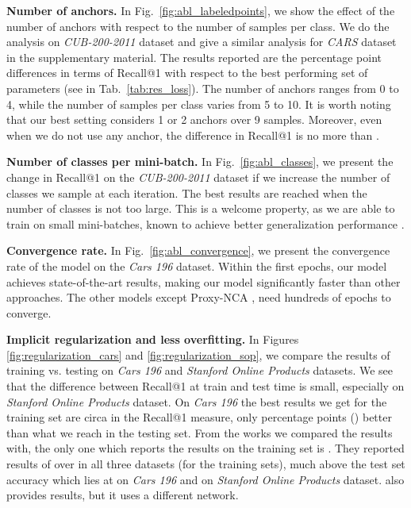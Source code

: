 \documentclass[runningheads]{llncs}
\begin{document}
\textbf{Number of anchors.} 
In Fig.~\ref{fig:abl_labeledpoints}, we show the effect of the number of anchors with respect to the number of samples per class. We do the analysis on \textit{CUB-200-2011} dataset and give a similar analysis for \textit{CARS} dataset in the supplementary material. The results reported are the percentage point differences in terms of Recall@1 with respect to the best performing set of parameters (see  in Tab.~\ref{tab:res_loss}). 
The number of anchors ranges from 0 to 4, while the number of samples per class varies from 5 to 10. 
It is worth noting that our best setting considers 1 or 2 anchors over 9 samples. Moreover, even when we do not use any anchor, the difference in Recall@1 is no more than .


\textbf{Number of classes per mini-batch.}
In Fig.~\ref{fig:abl_classes}, we present the change in Recall@1 on the \textit{CUB-200-2011} dataset if we increase the number of classes we sample at each iteration. The best results are reached when the number of classes is not too large. This is a welcome property, as we are able to train on small mini-batches, known to achieve better generalization performance \cite{DBLP:conf/iclr/KeskarMNST17}.

\textbf{Convergence rate.} In Fig.~\ref{fig:abl_convergence}, we present the convergence rate of the model on the \textit{Cars 196} dataset. Within the first  epochs, our model achieves state-of-the-art results, making our model significantly faster than other approaches. The other models except Proxy-NCA \cite{DBLP:conf/iccv/Movshovitz-Attias17}, need hundreds of epochs to converge. 


\textbf{Implicit regularization and less overfitting.} In Figures \ref{fig:regularization_cars} and \ref{fig:regularization_sop}, we compare the results of training vs. testing on \textit{Cars 196} \cite{KrauseStarkDengFei-Fei_3DRR2013} and \textit{Stanford Online Products} \cite{DBLP:conf/cvpr/SongXJS16} datasets.
We see that the difference between Recall@1 at train and test time is small, especially on \textit{Stanford Online Products} dataset.
On \textit{Cars 196} the best results we get for the training set are circa  in the Recall@1 measure, only  percentage points () better than what we reach in the testing set.
From the works we compared the results with, the only one which reports the results on the training set is \cite{DBLP:conf/icml/LawUZ17}. They reported results of over  in all three datasets (for the training sets), much above the test set accuracy which lies at  on \textit{Cars 196} and  on \textit{Stanford Online Products} dataset. \cite{DBLP:conf/wacv/VoH19} also provides results, but it uses a different network.
\end{document}
